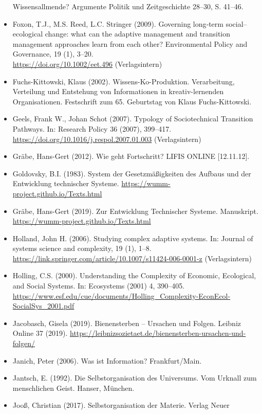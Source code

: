 \documentclass[11pt,a4paper]{article}
\begin{document}
\begin{itemize}
  Wissensallmende? Argumente Politik und Zeitgeschichte 28--30, S. 41--46.
\item Foxon, T.J., M.S. Reed, L.C. Stringer (2009). Governing long‐term
  social–ecological change: what can the adaptive management and transition
  management approaches learn from each other? Environmental Policy and
  Governance, 19 (1), 3--20.\\ \url{https://doi.org/10.1002/eet.496}
  (Verlagsintern)
\item Fuchs-Kittowski, Klaus (2002). Wissens-Ko-Produktion.  Verarbeitung,
  Verteilung und Entstehung von Informationen in kreativ-lernenden
  Organisationen.  Festschrift zum 65. Geburtstag von Klaus Fuchs-Kittowski.
\item Geels, Frank W., Johan Schot (2007). Typology of Sociotechnical
  Transition Pathways. In: Research Policy 36 (2007), 399–417.\\
  \url{https://doi.org/10.1016/j.respol.2007.01.003} (Verlagsintern)
\item Gräbe, Hans-Gert (2012). Wie geht Fortschritt? LIFIS ONLINE [12.11.12]. 
\item Goldovsky, B.I. (1983). System der Gesetzmäßigkeiten des Aufbaus und der
  Entwicklung technischer Systeme.
  \url{https://wumm-project.github.io/Texts.html} 
\item Gräbe, Hans-Gert (2019). Zur Entwicklung Technischer Systeme.
  Manuskript. \\ \url{https://wumm-project.github.io/Texts.html}
\item Holland, John H. (2006). Studying complex adaptive systems. In: Journal
  of systems science and complexity, 19 (1),
  1–8.\\ \url{https://link.springer.com/article/10.1007/s11424-006-0001-z}
  (Verlagsintern)
\item Holling, C.S. (2000). Understanding the Complexity of Economic,
  Ecological, and Social Systems. In: Ecosystems (2001) 4, 390–405.
  \url{https://www.esf.edu/cue/documents/Holling_Complexity-EconEcol-SocialSys_2001.pdf}
\item Jacobasch, Gisela (2019). Bienensterben -- Ursachen und Folgen.  Leibniz
  Online 37 (2019).
  \url{https://leibnizsozietaet.de/bienensterben-ursachen-und-folgen/}
\item Janich, Peter (2006). Was ist Information? Frankfurt/Main.
\item Jantsch, E. (1992). Die Selbstorganisation des Universums. Vom Urknall
  zum menschlichen Geist.  Hanser, München.
\item Jooß, Christian (2017). Selbstorganisation der Materie.  Verlag Neuer

\end{itemize}
\end{document}
